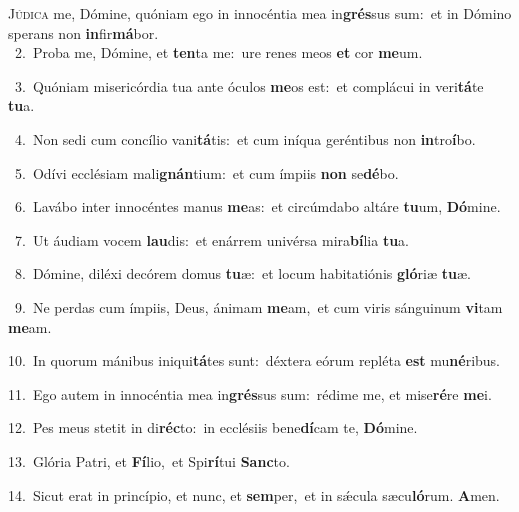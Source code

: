 \lettrine{\initial\textcolor{\initialcolor}{J}}{údica} me, Dómine, quóniam ego in innocéntia mea in\-\textbf{grés}\-sus sum:~\star et in Dómino sperans non \textbf{in}\-fir\-\textbf{má}\-bor.\\
{\numbfont\textcolor{\numbcolor}{~2.}}~Proba me, Dómine, et \textbf{ten}\-ta me:~\star ure renes meos \textbf{et} cor \textbf{me}\-um.\par
{\numbfont\textcolor{\numbcolor}{~3.}}~Quóniam misericórdia tua ante óculos \textbf{me}\-os est:~\star et complácui in veri\-\textbf{tá}\-te \textbf{tu}\-a.\par
{\numbfont\textcolor{\numbcolor}{~4.}}~Non sedi cum concílio vani\-\textbf{tá}\-tis:~\star et cum iníqua geréntibus non \textbf{in}\-tro\-\textbf{í}\-bo.\par
{\numbfont\textcolor{\numbcolor}{~5.}}~Odívi ecclésiam mali\-\textbf{gnán}\-tium:~\star et cum ímpiis \textbf{non} se\-\textbf{dé}\-bo.\par
{\numbfont\textcolor{\numbcolor}{~6.}}~Lavábo inter innocéntes manus \textbf{me}\-as:~\star et circúmdabo altáre \textbf{tu}\-um, \textbf{Dó}\-mine.\par
{\numbfont\textcolor{\numbcolor}{~7.}}~Ut áudiam vocem \textbf{lau}\-dis:~\star et enárrem univérsa mira\-\textbf{bí}\-lia \textbf{tu}\-a.\par
{\numbfont\textcolor{\numbcolor}{~8.}}~Dómine, diléxi decórem domus \textbf{tu}\-æ:~\star et locum habitatiónis \textbf{gló}\-riæ \textbf{tu}\-æ.\par
{\numbfont\textcolor{\numbcolor}{~9.}}~Ne perdas cum ímpiis, Deus, ánimam \textbf{me}\-am,~\star et cum viris sánguinum \textbf{vi}\-tam \textbf{me}\-am.\par
{\numbfont\textcolor{\numbcolor}{10.}}~In quorum mánibus iniqui\-\textbf{tá}\-tes sunt:~\star déxtera eórum repléta \textbf{est} mu\-\textbf{né}\-ribus.\par
{\numbfont\textcolor{\numbcolor}{11.}}~Ego autem in innocéntia mea in\-\textbf{grés}\-sus sum:~\star rédime me, et mise\-\textbf{ré}\-re \textbf{me}\-i.\par
{\numbfont\textcolor{\numbcolor}{12.}}~Pes meus stetit in di\-\textbf{réc}\-to:~\star in ecclésiis bene\-\textbf{dí}\-cam te, \textbf{Dó}\-mine.\par
{\numbfont\textcolor{\numbcolor}{13.}}~Glória Patri, et \textbf{Fí}\-lio,~\star et Spi\-\textbf{rí}\-tui \textbf{Sanc}\-to.\par
{\numbfont\textcolor{\numbcolor}{14.}}~Sicut erat in princípio, et nunc, et \textbf{sem}\-per,~\star et in sǽcula sæcu\-\textbf{ló}\-rum. \textbf{A}\-men.\par
